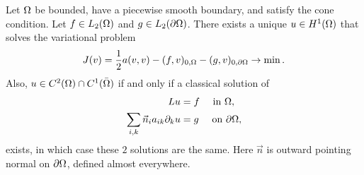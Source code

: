 \begin{thmx}{\quad}
   Let $\Omega$  be bounded, have a piecewise smooth boundary, and satisfy the 
   cone condition. Let $f \in L_2( \Omega)$ and $g\in L_2(\partial \Omega)$.
   There exists a unique $u \in H^1(\Omega)$ that solves the variational problem 
   \begin{equation*}
    J(v) = \frac{1}{2}a(v,v) - (f,v)_{0,\Omega} - (g,v)_{0,\partial\Omega} \to \min.
   \end{equation*}
   Also, $u \in C^2(\Omega)\cap C^1(\bar{\Omega})$ if and only if a classical solution 
   of 
   \begin{align}
    Lu &= f \quad \text{ in }\Omega, \nonumber \\
    \sum_{i,k}  \vec{n}_i a_{ik} \partial_k u &= g \quad \text{ on } \partial \Omega, \label{eq:neuman_condition_boundary}
   \end{align}
   exists, in which case these $2$ solutions are the same. Here $\vec{n}$ is outward 
   pointing normal on $\partial \Omega$, defined almost everywhere.
\end{thmx}
